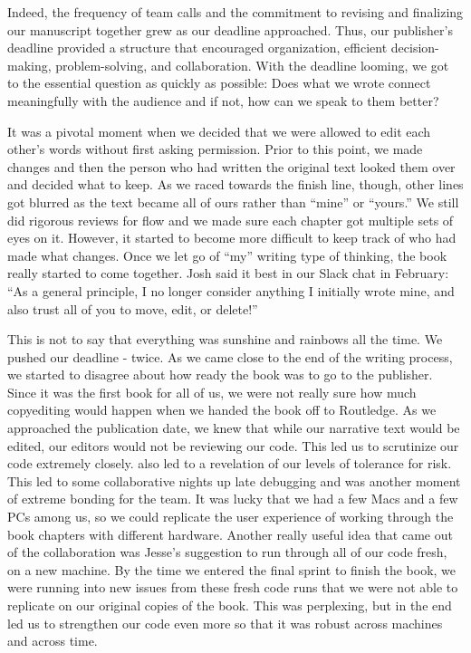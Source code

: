\documentclass[
  english,
  man]{apa6}
\begin{document}
Indeed, the frequency of team calls and the commitment to revising and finalizing our manuscript together grew as our deadline approached. Thus, our publisher's deadline provided a structure that encouraged organization, efficient decision-making, problem-solving, and collaboration. With the deadline looming, we got to the essential question as quickly as possible: Does what we wrote connect meaningfully with the audience and if not, how can we speak to them better?

It was a pivotal moment when we decided that we were allowed to edit each other's words without first asking permission. Prior to this point, we made changes and then the person who had written the original text looked them over and decided what to keep. As we raced towards the finish line, though, other lines got blurred as the text became all of ours rather than ``mine'' or ``yours.'' We still did rigorous reviews for flow and we made sure each chapter got multiple sets of eyes on it. However, it started to become more difficult to keep track of who had made what changes. Once we let go of ``my'' writing type of thinking, the book really started to come together. Josh said it best in our Slack chat in February: ``As a general principle, I no longer consider anything I initially wrote mine, and also trust all of you to move, edit, or delete!''

This is not to say that everything was sunshine and rainbows all the time. We pushed our deadline - twice. As we came close to the end of the writing process, we started to disagree about how ready the book was to go to the publisher. Since it was the first book for all of us, we were not really sure how much copyediting would happen when we handed the book off to Routledge.
As we approached the publication date, we knew that while our narrative text would be edited, our editors would not be reviewing our code. This led us to scrutinize our code extremely closely. also led to a revelation of our levels of tolerance for risk. This led to some collaborative nights up late debugging and was another moment of extreme bonding for the team. It was lucky that we had a few Macs and a few PCs among us, so we could replicate the user experience of working through the book chapters with different hardware. Another really useful idea that came out of the collaboration was Jesse's suggestion to run through all of our code fresh, on a new machine. By the time we entered the final sprint to finish the book, we were running into new issues from these fresh code runs that we were not able to replicate on our original copies of the book. This was perplexing, but in the end led us to strengthen our code even more so that it was robust across machines and across time.
\end{document}
